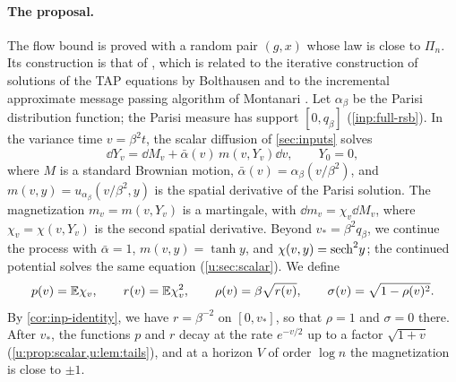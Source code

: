 \paragraph{The proposal.} The flow bound is proved with a random pair $(g,x)$
whose law is close to $\Pi_n$. Its construction is that of
\cite[Section~4]{oai-typical-upper}, which is related to the iterative
construction of solutions of the TAP equations by Bolthausen
\cite{bolthausen-2014} and to the incremental approximate message passing algorithm of
Montanari \cite{montanari-2021}. Let $\alpha_\beta$ be the Parisi distribution
function; the Parisi measure has support $[0,q_\beta]$ (\cref{inp:full-rsb}).
In the variance
time $v=\beta^2t$, the scalar diffusion of \cref{sec:inputs} solves
\[
 \dd Y_v=\dd M_v+\bar\alpha(v)\,m(v,Y_v)\dd v,\qquad Y_0=0,
\]
where $M$ is a standard Brownian motion, $\bar\alpha(v)=\alpha_\beta(v/\beta^2)$,
and $m(v,y)=u_{\alpha_\beta}(v/\beta^2,y)$ is the spatial derivative of the
Parisi solution. The magnetization $m_v=m(v,Y_v)$ is a martingale, with
$\dd m_v=\chi_v\dd M_v$, where $\chi_v=\chi(v,Y_v)$ is the second spatial
derivative. Beyond $v_*=\beta^2q_\beta$, we continue the process with
$\bar\alpha=1$, $m(v,y)=\tanh y$, and $\chi(v,y)={\rm sech}^2y$; the continued
potential solves the same equation (\cref{u:sec:scalar}). We define
\[
 p(v)=\mathbb E\chi_v,\qquad r(v)=\mathbb E\chi_v^2,\qquad
 \rho(v)=\beta\sqrt{r(v)},\qquad \sigma(v)=\sqrt{1-\rho(v)^2}.
\]
By \cref{cor:inp-identity}, we have $r=\beta^{-2}$ on $[0,v_*]$, so that
$\rho=1$ and $\sigma=0$ there. After $v_*$, the functions $p$ and $r$ decay at
the rate $e^{-v/2}$ up to a factor $\sqrt{1+v}$
(\cref{u:prop:scalar,u:lem:tails}), and at a horizon $V$ of order $\log n$ the
magnetization is close to $\pm1$.

